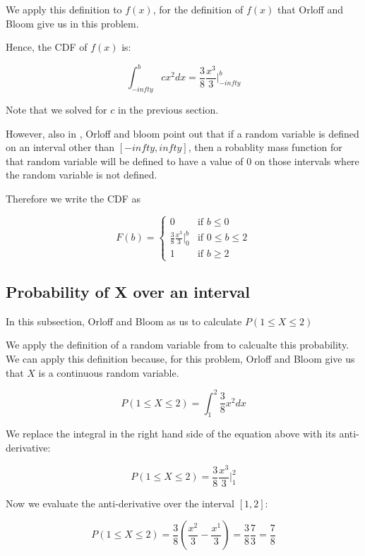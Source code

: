 \documentclass[a4paper,11pt]{article}
\begin{document}
We apply this definition to $f\left( x \right)$, for the definition of
$f\left( x \right)$ that Orloff and Bloom give us in this problem.

Hence, the CDF of $f \left( x \right)$ is:

\begin{equation}
    \int_{-infty}^{b} c x^{2} dx
      = \frac{3}{8} \frac{x^{3}}{3} \bigg\rvert_{-infty}^{b}
\end{equation}

Note that we solved for $c$ in the previous section.

However, also in \cite{reading5b}, Orloff and bloom point out that if a random
variable is defined on an interval other than $\left[-infty, infty \right]$,
then a robablity mass function for that random variable will be defined to
have a value of $0$ on those intervals where the random variable is not
defined.

Therefore we write the CDF as

\[
F \left( b \right) =
\begin{cases}
  0 & \text{if } b \leq 0 \\
   \frac{3}{8} \frac{x^{3}}{3} \bigg\rvert_{0}^{b}
    & \text{if } 0 \leq b \leq 2 \\
   1 & \text{if } b \geq 2
\end{cases}
\]
\subsection{Probability of X over an interval}

In this subsection, Orloff and Bloom as us to calculate
$P \left( 1 \leq X \leq 2 \right)$

We apply the definition of a random variable from \cite{reading5b} to calcualte
this probability. We can apply this definition because, for this problem,
Orloff and Bloom give us that $X$ is a continuous random variable.

\begin{equation}
P \left( 1 \leq X \leq 2 \right) = \int_{1}^{2} \frac{3}{8} x^{2} dx
\end{equation}

We replace the integral in the right hand side of the equation above with its
anti-derivative:

\begin{equation}
P \left( 1 \leq X \leq 2 \right) = \frac{3}{8} \frac{x^{3}}{3} \bigg\rvert_{1}^{2}
\end{equation}

Now we evaluate the anti-derivative over the interval $\left[ 1, 2 \right]$:

\begin{equation}
P \left( 1 \leq X \leq 2 \right)
  = \frac{3}{8} \left( \frac{x^{2}}{3} - \frac{x^{1}}{3} \right)
  = \frac{3}{8} \frac{7}{3}
  = \frac{7}{8}
\end{equation}

\printbibliography{}
\end{document}

